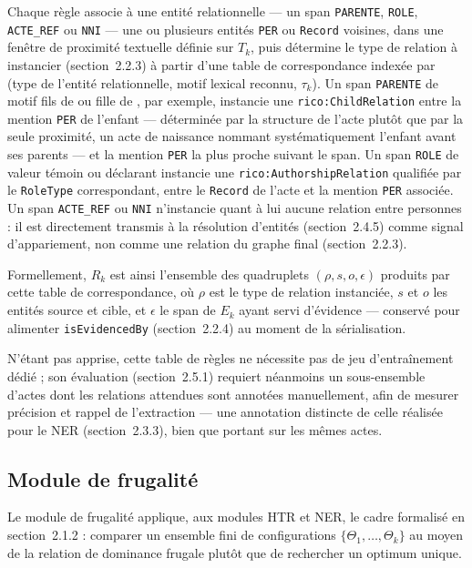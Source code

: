 Chaque règle associe à une entité \og relationnelle \fg{} --- un span \texttt{PARENTE}, \texttt{ROLE}, \texttt{ACTE\_REF} ou \texttt{NNI} --- une ou plusieurs entités \texttt{PER} ou \texttt{Record} voisines, dans une fenêtre de proximité textuelle définie sur $T_k$, puis détermine le type de relation à instancier (section~2.2.3) à partir d'une table de correspondance indexée par (type de l'entité relationnelle, motif lexical reconnu, $\tau_k$).
Un span \texttt{PARENTE} de motif \og fils de \fg{} ou \og fille de \fg{}, par exemple, instancie une \texttt{rico:ChildRelation} entre la mention \texttt{PER} de l'enfant --- déterminée par la structure de l'acte plutôt que par la seule proximité, un acte de naissance nommant systématiquement l'enfant avant ses parents --- et la mention \texttt{PER} la plus proche suivant le span.
Un span \texttt{ROLE} de valeur \og témoin \fg{} ou \og déclarant \fg{} instancie une \texttt{rico:AuthorshipRelation} qualifiée par le \texttt{RoleType} correspondant, entre le \texttt{Record} de l'acte et la mention \texttt{PER} associée.
Un span \texttt{ACTE\_REF} ou \texttt{NNI} n'instancie quant à lui aucune relation entre personnes : il est directement transmis à la résolution d'entités (section~2.4.5) comme signal d'appariement, non comme une relation du graphe final (section~2.2.3).

Formellement, $R_k$ est ainsi l'ensemble des quadruplets $(\rho, s, o, \epsilon)$
produits par cette table de correspondance, où $\rho$ est le type de relation
instanciée, $s$ et $o$ les entités source et cible, et $\epsilon$ le span de
$E_k$ ayant servi d'évidence --- conservé pour alimenter \texttt{isEvidencedBy}
(section~2.2.4) au moment de la sérialisation.

N'étant pas apprise, cette table de règles ne nécessite pas de jeu d'entraînement dédié ; son évaluation (section~2.5.1) requiert néanmoins un sous-ensemble d'actes dont les relations attendues sont annotées manuellement, afin de mesurer précision et rappel de l'extraction --- une annotation distincte de celle réalisée pour le NER (section~2.3.3), bien que portant sur les mêmes actes.

\subsection{Module de frugalité}

Le module de frugalité applique, aux modules HTR et NER, le cadre formalisé en section~2.1.2 : comparer un ensemble fini de configurations $\{\Theta_1,\dots,\Theta_k\}$ au moyen de la relation de dominance frugale plutôt que de rechercher un optimum unique.

